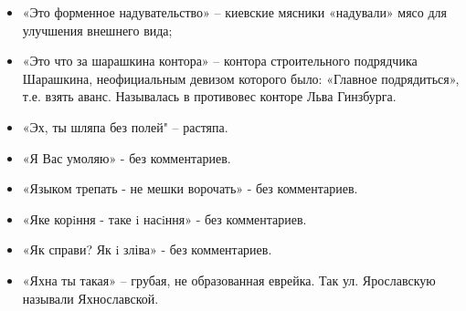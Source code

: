 \begin{itemize}
\item  «Это форменное надувательство» – киевские мясники «надували» мясо для улучшения внешнего вида;
\item  «Это что за шарашкина контора» – контора строительного подрядчика Шарашкина, неофициальным девизом которого было: «Главное подрядиться», т.е. взять аванс. Называлась в противовес конторе Льва Гинзбурга.
\item  «Эх, ты шляпа без полей" – растяпа.
\item  «Я Вас умоляю» - без комментариев.
\item  «Языком трепать - не мешки ворочать» - без комментариев.
\item  «Яке корiння - таке i насiння» - без комментариев.
\item  «Як справи? Як i зліва» - без комментариев.
\item  «Яхна ты такая» – грубая, не образованная еврейка. Так ул. Ярославскую называли Яхнославской.
\end{itemize}
